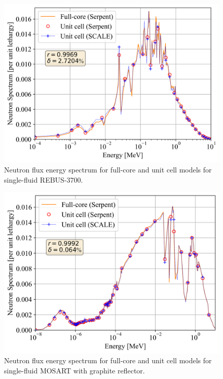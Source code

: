 \documentclass{anstrans}
\begin{document}
\begin{figure}[!htb]
  \centering
  \includegraphics[scale=0.58]{./Figures/rebus_full_vs_unit_spectrum.png}
        \vspace{-0.25in}
  \caption{Neutron flux energy spectrum for full-core and unit cell models for single-fluid REBUS-3700.}   
  \vspace{-0.2in}
  \label{fig:spectrum_rebus}
\end{figure}
\begin{figure}[!htb]
  \centering
  \includegraphics[scale=0.58]{./Figures/mosart_full_vs_unit_spectrum.png}
        \vspace{-0.25in}
  \caption{Neutron flux energy spectrum for full-core and unit cell models for single-fluid \gls{MOSART} with graphite reflector.}   
  \label{fig:spectrum_mosart}
\end{figure}
\end{document}
